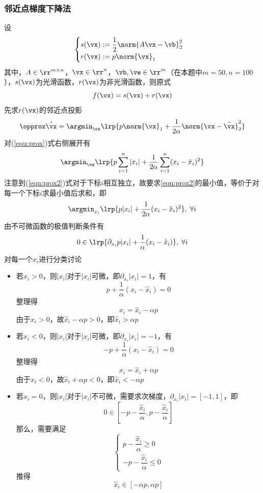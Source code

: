 \documentclass[logo,reportComp]{thesis}
\begin{document}
\subsubsection{邻近点梯度下降法}
设
\[\begin{cases}
s(\vx):=\dfrac{1}{2}\norm{A\vx-\vb}_2^2\\
r(\vx):=p\norm{\vx}_1
\end{cases}\]
其中，$A\in\rr^{m\times n}$，$\vx\in\rr^n$，$\vb,\ve\in\rr^m$（在本题中$m=50,n=100$），$s(\vx)$为光滑函数，$r(\vx)$为非光滑函数，则原式
\[f(\vx)=s(\vx)+r(\vx)\]
先求$r(\vx)$的邻近点投影
\begin{equation}
\label{equ:prox}
\opprox \hat{\vx}=\argmin_\vx\lrp{p\norm{\vx}_1+\frac{1}{2\alpha}\norm{\vx-\hat{\vx}}_2^2}
\end{equation}
对(\ref{equ:prox})式右侧展开有
\begin{equation}
\label{equ:prox2}
\argmin_\vx\lrp{p\sum_{i=1}^n|x_i|+\frac{1}{2\alpha}\sum_{i=1}^n(x_i-\hat{x}_i)^2}
\end{equation}
注意到(\ref{equ:prox2})式对于下标$i$相互独立，故要求\ref{equ:prox2}的最小值，等价于对每一个下标$i$求最小值后求和，即
\begin{equation}
\label{equ:prox3}
\argmin_{x_i}\lrp{p|x_i|+\frac{1}{2\alpha}(x_i-\hat{x}_i)^2},\;\forall i
\end{equation}
由不可微函数的极值判断条件有
\begin{equation}
0\in\lrp{\partial_{x_i}p|x_i|+\frac{1}{\alpha}(x_i-\hat{x}_i)},\;\forall i
\end{equation}
对每一个$x_i$进行分类讨论
\begin{itemize}
	\item 若$x_i>0$，则$|x_i|$对于$|x_i|$可微，即$\partial_{x_i}|x_i|=1$，有
	\[p+\frac{1}{\alpha}(x_i-\hat{x}_i)=0\]
	整理得
	\[x_i=\hat{x}_i-\alpha p\]
	由于$x_i>0$，故$\hat{x}_i-\alpha p>0$，即$\hat{x}_i>\alpha p$
	\item 若$x_i<0$，则$|x_i|$对于$|x_i|$可微，即$\partial_{x_i}|x_i|=-1$，有
	\[-p+\frac{1}{\alpha}(x_i-\hat{x}_i)=0\]
	整理得
	\[x_i=\hat{x}_i+\alpha p\]
	由于$x_i<0$，故$\hat{x}_i+\alpha p<0$，即$\hat{x}_i<-\alpha p$
	\item 若$x_i=0$，则$|x_i|$对于$|x_i|$不可微，需要求次梯度，$\partial_{x_i}|x_i|=[-1,1]$，即
	\[0\in\left[-p-\frac{\hat{x}_i}{\alpha},p-\frac{\hat{x}_i}{\alpha}\right]\]
	那么，需要满足
	\[\begin{cases}
	p-\dfrac{\hat{x}_i}{\alpha}\geq 0\\
	-p-\dfrac{\hat{x}_i}{\alpha}\leq 0
	\end{cases}\]
	推得
	\[\hat{x}_i\in[-\alpha p,\alpha p]\]
\end{itemize}
\end{document}
